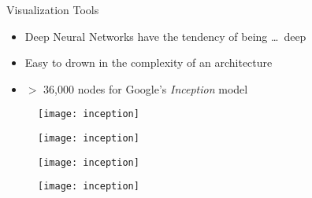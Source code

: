 \begin{slide}{Visualization Tools}
  \begin{itemize}
    \item<2-> Deep Neural Networks have the tendency of being \dots\, deep
    \item<3-> Easy to drown in the complexity of an architecture
    \item<4-> $>$ 36,000 nodes for Google's \emph{Inception} model
  \end{itemize}
\end{slide}

\begin{frame}
  \begin{figure}
     \advance\leftskip-2.2cm
    \texttt{[image: inception]}
  \end{figure}
\end{frame}

\begin{frame}
  \begin{figure}
    \advance\leftskip-2.2cm
    \texttt{[image: inception]}
  \end{figure}
\end{frame}

\begin{frame}
  \begin{figure}
    \advance\leftskip-2.2cm
    \texttt{[image: inception]}
  \end{figure}
\end{frame}

\begin{frame}
  \begin{figure}
    \advance\leftskip-2.2cm
    \texttt{[image: inception]}

  \end{figure}
\end{frame}


